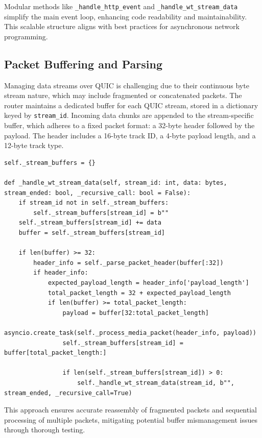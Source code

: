 Modular methods like \texttt{\_handle\_http\_event} and \texttt{\_handle\_wt\_stream\_data} simplify the main event loop, enhancing code readability and maintainability. This scalable structure aligns with best practices for asynchronous network programming.

\subsection{Packet Buffering and Parsing}
Managing data streams over QUIC is challenging due to their continuous byte stream nature, which may include fragmented or concatenated packets. The router maintains a dedicated buffer for each QUIC stream, stored in a dictionary keyed by \texttt{stream\_id}. Incoming data chunks are appended to the stream-specific buffer, which adheres to a fixed packet format: a 32-byte header followed by the payload. The header includes a 16-byte track ID, a 4-byte payload length, and a 12-byte track type.

\begin{lstlisting}[breaklines=true,basicstyle=\small\ttfamily,frame=single]
self._stream_buffers = {}

def _handle_wt_stream_data(self, stream_id: int, data: bytes, stream_ended: bool, _recursive_call: bool = False):
    if stream_id not in self._stream_buffers:
        self._stream_buffers[stream_id] = b""
    self._stream_buffers[stream_id] += data
    buffer = self._stream_buffers[stream_id]

    if len(buffer) >= 32:
        header_info = self._parse_packet_header(buffer[:32])
        if header_info:
            expected_payload_length = header_info['payload_length']
            total_packet_length = 32 + expected_payload_length
            if len(buffer) >= total_packet_length:
                payload = buffer[32:total_packet_length]
                asyncio.create_task(self._process_media_packet(header_info, payload))
                self._stream_buffers[stream_id] = buffer[total_packet_length:]

                if len(self._stream_buffers[stream_id]) > 0:
                    self._handle_wt_stream_data(stream_id, b"", stream_ended, _recursive_call=True)
\end{lstlisting}

This approach ensures accurate reassembly of fragmented packets and sequential processing of multiple packets, mitigating potential buffer mismanagement issues through thorough testing.

